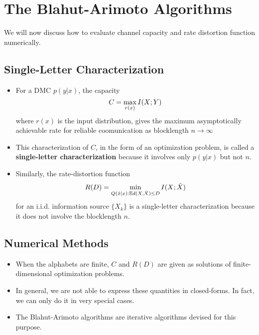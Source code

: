 \documentclass[../main.tex]{subfiles}
\begin{document}
\chapter{The Blahut-Arimoto Algorithms}
We will now discuss how to evaluate channel capacity and rate distortion function numerically.
\section{Single-Letter Characterization}
\begin{itemize}
    \item For a DMC $p(y|x)$, the capacity \[
    C=\max_{r(x)}I(X;Y)
    \] where $r(x)$ is the input distribution, gives the maximum asymptotically achievable rate for reliable coomunication as blocklength $n\to \infty$
    \item This characterization of $C$, in the form of an optimization problem, is called a \textbf{single-letter characterization} because it involves only $p(y|x)$ but not $n$.
    \item Similarly, the rate-distortion function\[
    R(D) = \min_{Q(\hat x|x):\mathbb{E} d(X,\hat X)\leq D} I(X;\hat X)
    \] for an i.i.d. information source $\{X_k\}$ is a single-letter characterization because it does not involve the blocklength $n$.
\end{itemize}
\section{Numerical Methods}
\begin{itemize}
    \item When the alphabets are finite, $C$ and $R(D)$ are given as solutions of finite-dimensional optimization problems.
    \item In general, we are not able to express these quantities in closed-forms. In fact, we can only do it in very special cases.
    \item The Blahut-Arimoto algorithms are iterative algorithms devised for this purpose.
\end{itemize}
\end{document}
